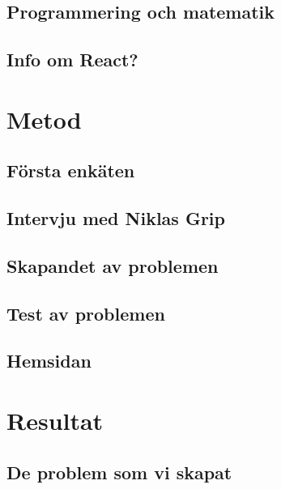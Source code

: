 \documentclass[11pt,a4paper]{article}
\begin{document}
    \subsection{Programmering och matematik}
        \label{sec:ProgrammeringOchMatematik}
        
        
    \subsection{Info om React?}

\section{Metod}
    \subsection{Första enkäten}
    
    
    \subsection{Intervju med Niklas Grip}
    
    
    \subsection{Skapandet av problemen}
    \label{sec:Skapandetavproblem}
        
        
    \subsection{Test av problemen}
        

    \subsection{Hemsidan}
        
       
\section{Resultat}

    \subsection{De problem som vi skapat}
    
\end{document}
